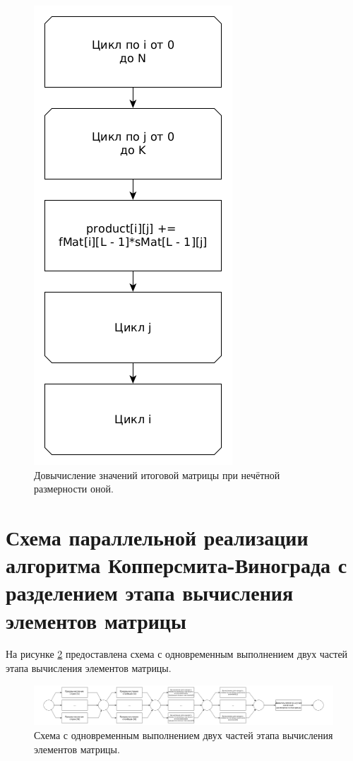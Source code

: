 \documentclass[12pt]{report}
\begin{document}
\begin{figure}
\begin{center}
\includegraphics[scale=0.4]{inc/img/paralPart3.png}
\captionsetup{justification=centering}
	\caption{Довычисление значений итоговой матрицы при нечётной размерности оной.}
	\label{img:paralPart3}	
\end{center}
\end{figure}
\newpage

\section{Схема параллельной реализации алгоритма Копперсмита-Винограда с разделением этапа вычисления элементов матрицы}
На рисунке \ref{img:scheme1} предоставлена схема с одновременным выполнением двух частей этапа вычисления элементов матрицы.

\begin{figure}
\begin{center}
\includegraphics[scale=0.21]{inc/img/paralScheme1.png}
\captionsetup{justification=centering}
	\caption{Схема с одновременным выполнением двух частей этапа вычисления элементов матрицы.}
	\label{img:scheme1}	
\end{center}
\end{figure}
\newpage
\end{document}
